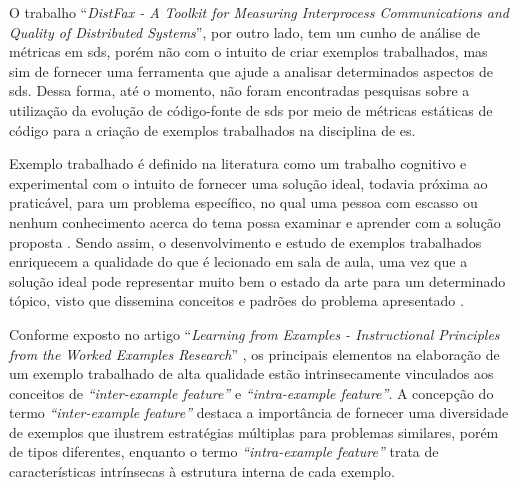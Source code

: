 O trabalho ``\textit{DistFax - A Toolkit for Measuring Interprocess Communications and Quality of Distributed Systems}''\cite{DistFax}, por outro lado, tem um cunho de análise de métricas em \gls{sds}, porém não com o intuito de criar exemplos trabalhados, mas sim de fornecer uma ferramenta que ajude a analisar determinados aspectos de \gls{sds}. Dessa forma, até o momento, não foram encontradas pesquisas sobre a utilização da evolução de código-fonte de \gls{sds} por meio de métricas estáticas de código para a criação de exemplos trabalhados na disciplina de \gls{es}.

Exemplo trabalhado é definido na literatura como um trabalho cognitivo e experimental com o intuito de fornecer uma solução ideal, todavia próxima ao praticável, para um problema específico, no qual uma pessoa com escasso ou nenhum conhecimento acerca do tema possa examinar e aprender com a solução proposta \cite{Robert.Atkinson-etal:2000}. Sendo assim, o desenvolvimento e estudo de exemplos trabalhados enriquecem a qualidade do que é lecionado em sala de aula, uma vez que a solução ideal pode representar muito bem o estado da arte para um determinado tópico, visto que dissemina conceitos e padrões do problema apresentado \cite{Robert.Atkinson-etal:2000}.

Conforme exposto no artigo ``\textit{Learning from Examples - Instructional Principles from the Worked Examples Research}'' \cite{Robert.Atkinson-etal:2000}, os principais elementos na elaboração de um exemplo trabalhado de alta qualidade estão intrinsecamente vinculados aos conceitos de \textit{``inter-example feature''} e \textit{``intra-example feature''}. A concepção do termo \textit{``inter-example feature''} destaca a importância de fornecer uma diversidade de exemplos que ilustrem estratégias múltiplas para problemas similares, porém de tipos diferentes, enquanto o termo \textit{``intra-example feature''} trata de características intrínsecas à estrutura interna de cada exemplo. 

